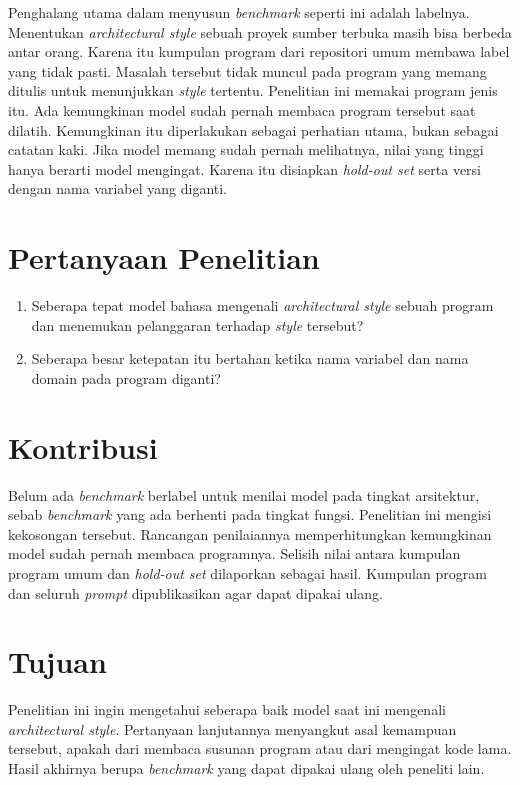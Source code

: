 \documentclass[11pt,a4paper]{article}
\begin{document}
Penghalang utama dalam menyusun \textit{benchmark} seperti ini adalah labelnya. Menentukan \textit{architectural style} sebuah proyek sumber terbuka masih bisa berbeda antar orang. Karena itu kumpulan program dari repositori umum membawa label yang tidak pasti. Masalah tersebut tidak muncul pada program yang memang ditulis untuk menunjukkan \textit{style} tertentu. Penelitian ini memakai program jenis itu. Ada kemungkinan model sudah pernah membaca program tersebut saat dilatih. Kemungkinan itu diperlakukan sebagai perhatian utama, bukan sebagai catatan kaki. Jika model memang sudah pernah melihatnya, nilai yang tinggi hanya berarti model mengingat. Karena itu disiapkan \textit{hold-out set} serta versi dengan nama variabel yang diganti.

\section{Pertanyaan Penelitian}

\begin{enumerate}[label=\textbf{Pertanyaan \arabic*.}, leftmargin=*, labelsep=0.5em]
  \item Seberapa tepat model bahasa mengenali \textit{architectural style} sebuah program dan menemukan pelanggaran terhadap \textit{style} tersebut?
  \item Seberapa besar ketepatan itu bertahan ketika nama variabel dan nama domain pada program diganti?
\end{enumerate}

\section{Kontribusi}

Belum ada \textit{benchmark} berlabel untuk menilai model pada tingkat arsitektur, sebab \textit{benchmark} yang ada berhenti pada tingkat fungsi. Penelitian ini mengisi kekosongan tersebut. Rancangan penilaiannya memperhitungkan kemungkinan model sudah pernah membaca programnya. Selisih nilai antara kumpulan program umum dan \textit{hold-out set} dilaporkan sebagai hasil. Kumpulan program dan seluruh \textit{prompt} dipublikasikan agar dapat dipakai ulang.

\section{Tujuan}

Penelitian ini ingin mengetahui seberapa baik model saat ini mengenali \textit{architectural style}. Pertanyaan lanjutannya menyangkut asal kemampuan tersebut, apakah dari membaca susunan program atau dari mengingat kode lama. Hasil akhirnya berupa \textit{benchmark} yang dapat dipakai ulang oleh peneliti lain.
\end{document}
